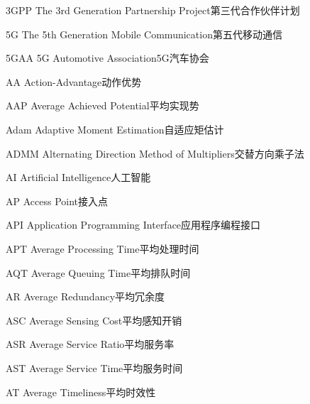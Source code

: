 
\begin{abbreviate}[0mm][18mm]
\item[3GPP] The 3rd Generation Partnership Project\hspace{1em}第三代合作伙伴计划
\item[5G] The 5th Generation Mobile Communication\hspace{1em}第五代移动通信
\item[5GAA] 5G Automotive Association\hspace{1em}5G汽车协会
\item[AA] Action-Advantage\hspace{1em}动作优势
\item[AAP] Average Achieved Potential\hspace{1em}平均实现势
\item[Adam] Adaptive Moment Estimation\hspace{1em}自适应矩估计
\item[ADMM] Alternating Direction Method of Multipliers\hspace{1em}交替方向乘子法
\item[AI] Artificial Intelligence\hspace{1em}人工智能
\item[AP] Access Point\hspace{1em}接入点
\item[API] Application Programming Interface\hspace{1em}应用程序编程接口
\item[APT] Average Processing Time\hspace{1em}平均处理时间
\item[AQT] Average Queuing Time\hspace{1em}平均排队时间
\item[AR] Average Redundancy\hspace{1em}平均冗余度
\item[ASC] Average Sensing Cost\hspace{1em}平均感知开销
\item[ASR] Average Service Ratio\hspace{1em}平均服务率
\item[AST] Average Service Time\hspace{1em}平均服务时间
\item[AT] Average Timeliness\hspace{1em}平均时效性

\end{abbreviate}
